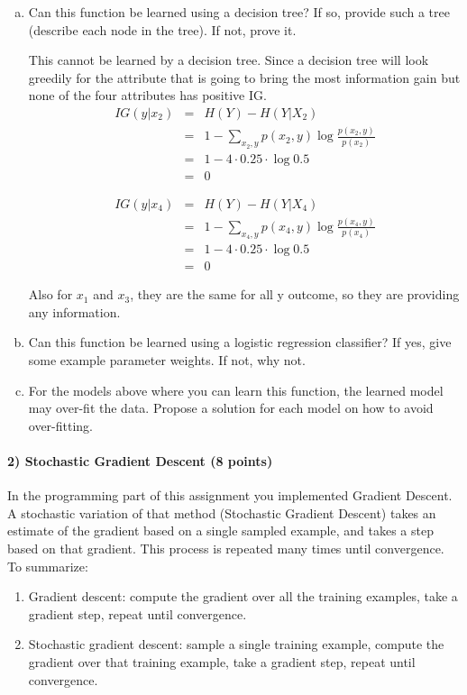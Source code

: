 \documentclass[11pt]{article}
\begin{document}
\begin{enumerate}[(a)]
\item Can this function be learned using a decision tree? If so, provide such a tree (describe each node in the tree). If not, prove it.


This cannot be learned by a decision tree. Since a decision tree will look greedily for the attribute that is going to bring the most information gain but none of the four attributes has positive IG.
\begin{eqnarray*}
IG(y | x_2) &=&H(Y) - H(Y|X_2) \\
		 &=&1 - \sum_{x_2,y} p(x_2, y) \log \frac{p(x_2,y)}{p(x_2)}\\
		 &=&1 -4 \cdot 0.25 \cdot \log 0.5 \\
		 &=&0
\end{eqnarray*}

\begin{eqnarray*}
IG(y | x_4) &=&H(Y) - H(Y|X_4) \\
		 &=&1 - \sum_{x_4,y} p(x_4, y) \log \frac{p(x_4,y)}{p(x_4)}\\
		 &=&1 -4 \cdot 0.25 \cdot \log 0.5 \\
		 &=&0
\end{eqnarray*}

Also for $x_1$ and $x_3$, they are the same for all y outcome, so they are providing any information.
\item Can this function be learned using a logistic regression classifier? If yes, give some example parameter weights. If not, why not.



\item For the models above where you can learn this function, the learned model may over-fit the data. Propose a solution for each model on how to avoid over-fitting.
\end{enumerate}

\paragraph{2) Stochastic Gradient Descent (8 points)}
In the programming part of this assignment you implemented Gradient Descent. A stochastic variation of that method (Stochastic Gradient Descent) takes an estimate of the gradient based on a single sampled example, and takes a step based on that gradient. This process is repeated many times until convergence. To summarize:
\begin{enumerate}
\item Gradient descent: compute the gradient over all the training examples, take a gradient step, repeat until convergence.
\item Stochastic gradient descent: sample a single training example, compute the gradient over that training example, take a gradient step, repeat until convergence.
\end{enumerate}
\end{document}
